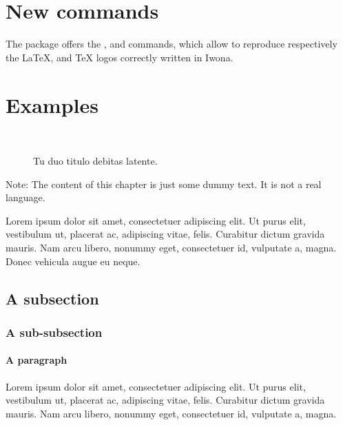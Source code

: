 \section{New commands}

The package offers the ,  and  commands, which allow to reproduce respectively the \LaTeX, \LaTeXe{} and \TeX{} logos correctly written in Iwona.






\section{Examples}

\begin{figure}
\centering
{} \quad
{} \\
 \quad
{}
\caption[Tu duo titulo debitas latente.]{Tu duo titulo debitas
latente.}\label{fig:example}
\end{figure}

Note: The content of this chapter is just some dummy text. It is not a real language.

Lorem ipsum dolor sit amet, consectetuer adipiscing elit. Ut purus elit, vestibulum ut, placerat ac, adipiscing vitae, felis. Curabitur dictum gravida mauris. Nam arcu libero, nonummy eget, consectetuer id, vulputate a, magna. Donec vehicula augue eu neque.

\subsection*{A subsection}
\lipsum[2]

\subsubsection*{A sub-subsection}
\lipsum[3]

\paragraph{A paragraph} Lorem ipsum dolor sit amet, consectetuer adipiscing elit. Ut purus elit, vestibulum ut, placerat ac, adipiscing vitae, felis. Curabitur dictum gravida mauris. Nam arcu libero, nonummy eget, consectetuer id, vulputate a, magna.

